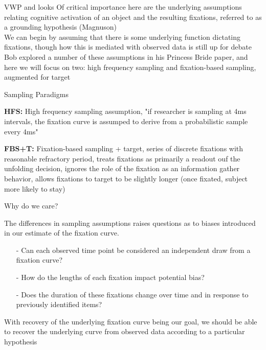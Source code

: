 \documentclass{beamer}
\begin{document}
\begin{frame}{VWP and looks}
Of critical importance here are the underlying assumptions relating cognitive activation of an object and the resulting fixations, referred to as a grounding hypothesis (Magnuson) \newline \\

We can begin by assuming that there is some underlying function dictating fixations, though how this is mediated with observed data is still up for debate \newline \\

Bob explored a number of these assumptions in his Princess Bride paper, and here we will focus on two: high frequency sampling and fixation-based sampling, augmented for target

\end{frame}


\begin{frame}{Sampling Paradigms}

\textbf{HFS:} High frequency sampling assumption, "if researcher is sampling at 4ms intervals, the fixation curve is assumped to derive from a probabilistic sample every 4ms" \newline 

\textbf{FBS+T:} Fixation-based sampling + target, series of discrete fixations with reasonable refractory period, treats fixations as primarily a readout ouf the unfolding decision, ignores the role of the fixation as an information gather behavior, allows fixations to target to be slightly longer (once fixated, subject more likely to stay)
\end{frame}

\begin{frame}{Why do we care?}

The differences in sampling assumptions raises questions as to biases introduced in our estimate of the fixation curve. \newline

\begin{itemize}
  \item[-] Can each observed time point be considered an independent draw from a fixation curve?
  \item[-] How do the lengths of each fixation impact potential bias?
  \item[-] Does the duration of these fixations change over time and in response to previously identified items?
\end{itemize}

\vspace{4mm}

With recovery of the underlying fixation curve being our goal, we should be able to recover the underlying curve from observed data according to a particular hypothesis \newline 


\end{frame}
\end{document}
